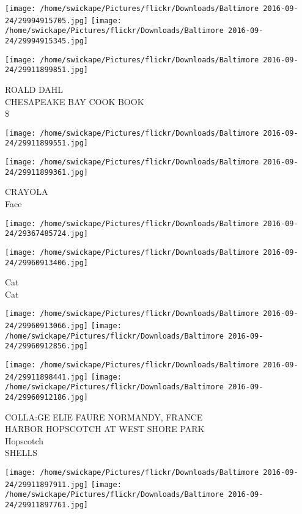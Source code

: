 \documentclass[10pt,letterpaper]{article}
\begin{document}
\texttt{[image: /home/swickape/Pictures/flickr/Downloads/Baltimore 2016-09-24/29994915705.jpg]}
\texttt{[image: /home/swickape/Pictures/flickr/Downloads/Baltimore 2016-09-24/29994915345.jpg]}

\texttt{[image: /home/swickape/Pictures/flickr/Downloads/Baltimore 2016-09-24/29911899851.jpg]}

ROALD DAHL\\
CHESAPEAKE BAY COOK BOOK\\
\$
\pagebreak

\texttt{[image: /home/swickape/Pictures/flickr/Downloads/Baltimore 2016-09-24/29911899551.jpg]}

\vspace{0.25in}
\texttt{[image: /home/swickape/Pictures/flickr/Downloads/Baltimore 2016-09-24/29911899361.jpg]}

CRAYOLA\\
Face
\pagebreak

\texttt{[image: /home/swickape/Pictures/flickr/Downloads/Baltimore 2016-09-24/29367485724.jpg]}

\vspace{0.25in}
\texttt{[image: /home/swickape/Pictures/flickr/Downloads/Baltimore 2016-09-24/29960913406.jpg]}

Cat\\
Cat
\pagebreak

\texttt{[image: /home/swickape/Pictures/flickr/Downloads/Baltimore 2016-09-24/29960913066.jpg]}
\texttt{[image: /home/swickape/Pictures/flickr/Downloads/Baltimore 2016-09-24/29960912856.jpg]}

\texttt{[image: /home/swickape/Pictures/flickr/Downloads/Baltimore 2016-09-24/29911898441.jpg]}
\texttt{[image: /home/swickape/Pictures/flickr/Downloads/Baltimore 2016-09-24/29960912186.jpg]}

COLLA:GE ELIE FAURE NORMANDY, FRANCE\\
HARBOR HOPSCOTCH AT WEST SHORE PARK\\
Hopscotch\\
SHELLS
\pagebreak

\texttt{[image: /home/swickape/Pictures/flickr/Downloads/Baltimore 2016-09-24/29911897911.jpg]}
\texttt{[image: /home/swickape/Pictures/flickr/Downloads/Baltimore 2016-09-24/29911897761.jpg]}
\end{document}
